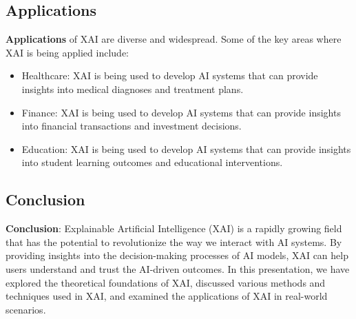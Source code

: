 \subsection{Applications}
\textbf{Applications} of XAI are diverse and widespread. Some of the key areas where XAI is being applied include:\n\begin{itemize}
\item Healthcare: XAI is being used to develop AI systems that can provide insights into medical diagnoses and treatment plans.\n\item Finance: XAI is being used to develop AI systems that can provide insights into financial transactions and investment decisions.\n\item Education: XAI is being used to develop AI systems that can provide insights into student learning outcomes and educational interventions.\n\end{itemize}
\n\subsection{Conclusion}
\textbf{Conclusion}: Explainable Artificial Intelligence (XAI) is a rapidly growing field that has the potential to revolutionize the way we interact with AI systems. By providing insights into the decision-making processes of AI models, XAI can help users understand and trust the AI-driven outcomes. In this presentation, we have explored the theoretical foundations of XAI, discussed various methods and techniques used in XAI, and examined the applications of XAI in real-world scenarios.